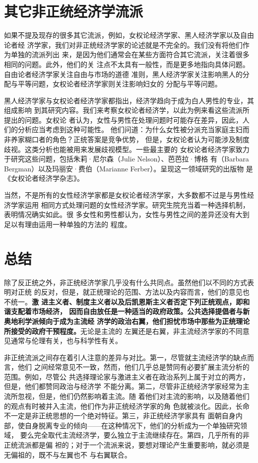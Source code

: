 \section{其它非正统经济学流派}

如果不提及现存的很多其它流派，例如，女权论经济学家、黑人经济学家以及自由论者经
济学家，我们对非正统经济学家的论述就是不完全的。我们没有将他们作为单独的流派列出
来，是因为他们通常会在某些方面符合其它流派，关注着很多相同的问题。此外，他们的关
注点不太具有一般性，而是更多地指向具体问题。自由论者经济学家关注自由与市场的道德
准则，黑人经济学家关注影响黑人的分配与平等问题，女权论者经济学家则关注影响妇女的
分配与平等问题。

黑人经济学家与女权论者经济学家都指出，经济学趋向于成为白人男性的专业，其组成影响
到其研究内容。我们来考察女权论者经济学，以此为例来看这些流派所提出的问题。女权论
者认为，女性与男性在处理问题时可能存在差异，因此，人们的分析应当考虑到这种可能性。
他们问道：为什么女性被分派充当家庭主妇而非养家糊口者的角色？正统答案是竞争优势，
但是，女权论者认为可能涉及制度歧视。这类分析也能被用来发展歧视模型。一些最主要的
女权论者经济学家致力于研究这些问题，包括朱莉·尼尔森（Julie Nelson）、芭芭拉·博格
有（Barbara Bergman）以及玛丽安·费伯（Marianne Ferber）。呈现这一领域研究的出版物
是《女权论者经济学杂志》。

当然，不是所有的女性经济学家都是女权论者经济学家，大多数都不过是与男性经济学家运用
相同方式处理问题的女性经济学家。研究生院充当着一种选择机制，表明情况确实如此。很
多女性和男性都认为，女性与男性之间的差异还没有大到足以有理由运用一种单独的方法的
程度。

\section{总结}

除了反正统之外，非正统经济学家几乎没有什么共同点。虽然他们以不同的方式表明对正统
的反对，但是，就正统理论的范围、方法以及内容而言，他们的意见也不统一。\textbf{激
  进主义者、制度主义者以及后凯恩斯主义者否定下列正统观点，即和谐支配着市场经济，
  因而自由放任是一种适当的政府政策。公共选择提倡者与新奥地利学派倾向于成为主流经
  济学的政治右翼，他们担忧市场中那些为正统理论所接受的政府干预程度。}无论是主流的
左翼还是右翼，非主流经济学家的不同意见通常与伦理有关，也与科学性有关。

非正统流派之间存在着引人注意的差异与对比。第一，尽管就主流经济学的缺点而言，他们
之间经常意见不一致，然而，他们几乎总是赞同有必要扩展主流分析的范围。例如，尽管公
共选择理论家与激进主义者在政治系列上属于对立的两方，但是，他们都赞同政治与经济学
不能分离。第二，尽管非正统经济学家经常为主流所忽视，但是，他们仍然影响着主流。随
着他们对主流的影响，以及随着他们的观点有时被并入主流，他们作为非正统经济学家的角
色就被淡化。因此，长命不一定是非正统思想的一个绝对特征。第三，非正统经济学家具有
面朝自身内部，使自身脱离专业的倾向——在这种情况下，他们的分析成为一个单独研究领域，
要么完全取代主流经济学，要么独立于主流继续存在。第四，几乎所有的非正统流派都是偏
袒的；对于一个流派来说，要想对理论产生重要影响，就必须是无偏祖的，既不与左翼也不
与右翼联合。

